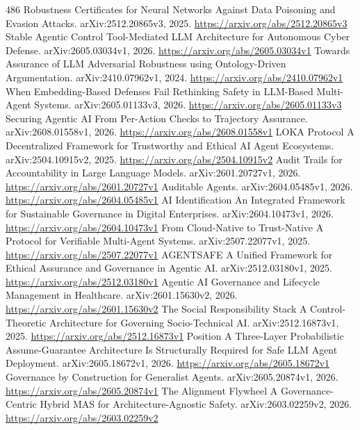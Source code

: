 \documentclass[11pt]{article}
\begin{document}
\begin{thebibliography}{486}
 Robustness Certificates for Neural Networks Against Data Poisoning and Evasion Attacks. arXiv:2512.20865v3, 2025. \url{https://arxiv.org/abs/2512.20865v3}
 Stable Agentic Control Tool-Mediated LLM Architecture for Autonomous Cyber Defense. arXiv:2605.03034v1, 2026. \url{https://arxiv.org/abs/2605.03034v1}
 Towards Assurance of LLM Adversarial Robustness using Ontology-Driven Argumentation. arXiv:2410.07962v1, 2024. \url{https://arxiv.org/abs/2410.07962v1}
 When Embedding-Based Defenses Fail Rethinking Safety in LLM-Based Multi-Agent Systems. arXiv:2605.01133v3, 2026. \url{https://arxiv.org/abs/2605.01133v3}
 Securing Agentic AI From Per-Action Checks to Trajectory Assurance. arXiv:2608.01558v1, 2026. \url{https://arxiv.org/abs/2608.01558v1}
 LOKA Protocol A Decentralized Framework for Trustworthy and Ethical AI Agent Ecosystems. arXiv:2504.10915v2, 2025. \url{https://arxiv.org/abs/2504.10915v2}
 Audit Trails for Accountability in Large Language Models. arXiv:2601.20727v1, 2026. \url{https://arxiv.org/abs/2601.20727v1}
 Auditable Agents. arXiv:2604.05485v1, 2026. \url{https://arxiv.org/abs/2604.05485v1}
 AI Identification An Integrated Framework for Sustainable Governance in Digital Enterprises. arXiv:2604.10473v1, 2026. \url{https://arxiv.org/abs/2604.10473v1}
 From Cloud-Native to Trust-Native A Protocol for Verifiable Multi-Agent Systems. arXiv:2507.22077v1, 2025. \url{https://arxiv.org/abs/2507.22077v1}
 AGENTSAFE A Unified Framework for Ethical Assurance and Governance in Agentic AI. arXiv:2512.03180v1, 2025. \url{https://arxiv.org/abs/2512.03180v1}
 Agentic AI Governance and Lifecycle Management in Healthcare. arXiv:2601.15630v2, 2026. \url{https://arxiv.org/abs/2601.15630v2}
 The Social Responsibility Stack A Control-Theoretic Architecture for Governing Socio-Technical AI. arXiv:2512.16873v1, 2025. \url{https://arxiv.org/abs/2512.16873v1}
 Position A Three-Layer Probabilistic Assume-Guarantee Architecture Is Structurally Required for Safe LLM Agent Deployment. arXiv:2605.18672v1, 2026. \url{https://arxiv.org/abs/2605.18672v1}
 Governance by Construction for Generalist Agents. arXiv:2605.20874v1, 2026. \url{https://arxiv.org/abs/2605.20874v1}
 The Alignment Flywheel A Governance-Centric Hybrid MAS for Architecture-Agnostic Safety. arXiv:2603.02259v2, 2026. \url{https://arxiv.org/abs/2603.02259v2}

\end{thebibliography}
\end{document}
